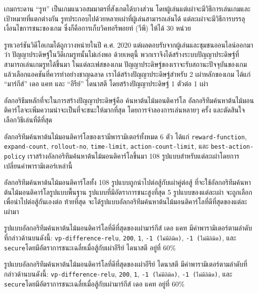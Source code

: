 \maketitle
\makesignature

\ifproject
\begin{abstractTH}
เกมกระดาน ``รูท'' เป็นเกมแนวอสมมาตรที่สังเกตได้บางส่วน โดยผู้เล่นแต่เผ่าจะมีวิธีการเล่นเกมและเป้าหมายที่แตกต่างกัน รูทประกอบไปด้วยหลายเผ่าที่ผู้เล่นสามารถเล่นได้ แต่ละเผ่าจะมีวิธีการบรรลุเงื่อนไขการชนะของเกม ซึ่งก็คือการเก็บวิคทอรีพอยท์ (วีพี) ให้ได้ 30 หน่วย

รูทเวอร์ชันวิดีโอเกมได้ถูกวางหน่ายในปี ค.ศ. 2020 แต่ผลตอบรับจากผู้เล่นและชุมชนออนไลน์ออกมาว่า ปัญญาประดิษฐ์ในวีดีเกมรูทนั้นไม่เก่งพอ ด้วยเหตุนี้ พวกเราจึงได้สร้างระบบปัญญาประดิษฐ์ที่สามารถเล่นเกมรูทได้ขึ้นมา ในแต่ละเฟสของเกม ปัญญาประดิษฐ์ของเราจะรับสถานะปัจจุบันของเกมแล้วเลือกแอคชันที่ควรทำอย่างชาญฉลาด เราได้สร้างปัญญาประดิษฐ์สำหรับ 2 เผ่าหลักของเกม ได้แก่ ``มาร์กีส์'' เดอ แคท และ ``อีรีย์'' ไดนาสตี โดยสร้างปัญญาประดิษฐ์ 1 ตัวต่อ 1 เผ่า

อัลกอริธึมหลักที่จะในการสร้างปัญญาประดิษฐ์คือ ค้นหาต้นไม้มอนติคาร์โล อัลกอริทึมค้นหาต้นไม้มอนติคาร์โลจะเพิ่มความน่าจะเป็นที่จะชนะให้มากที่สุด โดยการจำลองการเล่นหลายๆ ครั้ง และตัดสินใจเลือกวิธีเล่นที่ดีที่สุด

อัลกอริทึมค้นหาต้นไม้มอนติคาร์โลของเรามีพารามิเตอร์ทั้งหมด 6 ตัว ได้แก่ \texttt{reward-function}, \texttt{expand-count}, \texttt{rollout-no}, \texttt{time-limit}, \texttt{action-count-limit}, และ \texttt{best-action-policy} เราสร้างอัลกอริทึมค้นหาต้นไม้มอนติคาร์โลขึ้นมา 108 รูปแบบสำหรับแต่ละเผ่าโดยการเปลี่ยนค่าพารามิเตอร์เหล่านี้

อัลกอริทึมค้นหาต้นไม้มอนติคาร์โลทั้ง 108 รูปแบบถูกนำไปต่อสู้กับเผ่าคู่ต่อสู้ ที่จะใช้อัลกอริทึมค้นหาต้นไม้มอนติคาร์โลรูปแบบพื้นฐาน รูปแบบที่มีอัตราการชนะสูงที่สุด 5 รูปแบบของแต่ละเผ่า จะถูกเลือกเพื่อนำไปต่อสู้กันเองต่อ ท้ายที่สุด จะได้รูปแบบอัลกอริทึมค้นหาต้นไม้มอนติคาร์โลที่ดีที่สุดของแต่ละเผ่ามา

รูปแบบอัลกอริทึมค้นหาต้นไม้มอนติคาร์โลที่ดีที่สุดของเผ่ามาร์กีส์ เดอ แคท มีค่าพารามิเตอร์ตามลำดับที่กล่าวด้านบนดังนี้: \texttt{vp-difference-relu}, \texttt{200}, \texttt{1}, \texttt{-1 (ไม่มีลิมิต)}, \texttt{-1 (ไม่มีลิมิต)}, และ \texttt{secure}โดยมีอัตราการชนะเฉลี่ยเมื่อสู้กับเผ่าอีรีย์ ไดนาสตี อยู่ที่ 60\%

รูปแบบอัลกอริทึมค้นหาต้นไม้มอนติคาร์โลที่ดีที่สุดของเผ่าอีรีย์ ไดนาสตี มีค่าพารามิเตอร์ตามลำดับที่กล่าวด้านบนดังนี้: \texttt{vp-difference-relu}, \texttt{200}, \texttt{1}, \texttt{-1 (ไม่มีลิมิต)}, \texttt{-1 (ไม่มีลิมิต)}, และ \texttt{secure}โดยมีอัตราการชนะเฉลี่ยเมื่อสู้กับเผ่ามาร์กีส์ เดอ แคท อยู่ที่ 60\%


\end{abstractTH}
